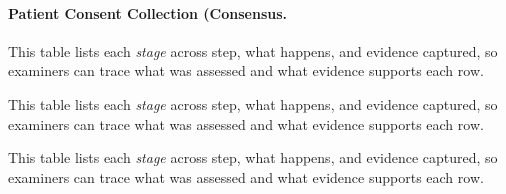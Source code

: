 \paragraph{Patient Consent Collection (Consensus.}



\noindent This table lists each \textit{stage} across step, what happens, and evidence captured, so examiners can trace what was assessed and what evidence supports each row.



\noindent This table lists each \textit{stage} across step, what happens, and evidence captured, so examiners can trace what was assessed and what evidence supports each row.


\noindent This table lists each \textit{stage} across step, what happens, and evidence captured, so examiners can trace what was assessed and what evidence supports each row.



